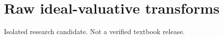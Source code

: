 \documentclass[11pt]{article}
\theoremstyle{definition}
\begin{document}
\section*{Raw ideal-valuative transforms}
\noindent Isolated research candidate. Not a verified textbook release.





\end{document}
